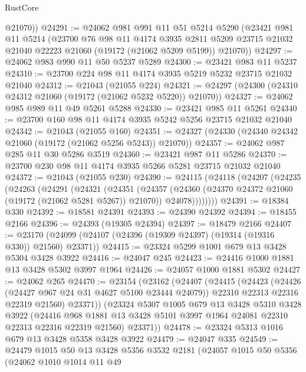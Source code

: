 \begin{lexlean}{RustCore}
\begin{coremodule}
        @21070))
@24291 := @24062
    @981
    @991
    @11
    @51
    @5214
    @5290
    (@23421
      @981
      @11
      @5214
      (@23700
        @76
        @98
        @11
        @4174
        @3935
        @2811
        @5209
        @23715
        @21032
        @21040
        @22223
        @21060
        (@19172 (@21062 @5209 @5199))
        @21070))
@24297 := @24062 @983 @990 @11 @50 @5237 @5289
@24300 := @23421 @983 @11 @5237
@24310 := @23700 @224 @98 @11 @4174 @3935 @5219 @5232 @23715 @21032 @21040
@24312 := @21043 (@21055 @224)
@24321 := @24297 (@24300 (@24310 @24312 @21060 (@19172 (@21062 @5232 @5220)) @21070))
@24327 := @24062 @985 @989 @11 @49 @5261 @5288
@24330 := @23421 @985 @11 @5261
@24340 := @23700 @160 @98 @11 @4174 @3935 @5242 @5256 @23715 @21032 @21040
@24342 := @21043 (@21055 @160)
@24351 := @24327 (@24330 (@24340 @24342 @21060 (@19172 (@21062 @5256 @5243)) @21070))
@24357 := @24062 @987 @285 @11 @30 @5286 @3519
@24360 := @23421 @987 @11 @5286
@24370 := @23700 @230 @98 @11 @4174 @3935 @5266 @5281 @23715 @21032 @21040
@24372 := @21043 (@21055 @230)
@24390 := @24115
    (@24118
      (@24207
        (@24235
          (@24263
            (@24291
              (@24321
                (@24351
                  (@24357
                    (@24360 (@24370 @24372 @21060 (@19172 (@21062 @5281 @5267)) @21070))
                    @24078))))))))
@24391 := @18384 @330
@24392 := @18581 @24391
@24393 := @24390 @24392
@24394 := @18455 @2166
@24396 := @24393 (@19305 @24394)
@24397 := @18479 @2166
@24407 := @23170 (@24099 (@24107 (@24396 (@19309 @24397) (@19314 (@19316 @330)) @21560) @23371))
@24415 := @23324 @5299 @1001 @679 @13 @3428 @5304 @3428 @3922
@24416 := @24047 @245
@24423 := @24416 @1000 @1881 @13 @3428 @5302 @3997 @1964
@24426 := @24057 @1000 @1881 @5302
@24427 := @24062 @265
@24470 := @23154
    (@23162
      (@24407
        (@24415
          (@24423
            (@24426 (@24427 @967 @24 @31 @4627 @5100 @23444 @24079))
            @22310
            @22313
            @22316
            @22319
            @21560)
          @23371))
      (@23324
        @5307
        @1005
        @679
        @13
        @3428
        @5310
        @3428
        @3922
        (@24416 @968 @1881 @13 @3428 @5101 @3997 @1964 @24081 @22310 @22313 @22316 @22319 @21560)
        @23371))
@24478 := @23324 @5313 @1016 @679 @13 @3428 @5358 @3428 @3922
@24479 := @24047 @335
@24549 := @24479
    @1015
    @50
    @13
    @3428
    @5356
    @3532
    @2181
    (@24057
      @1015
      @50
      @5356
      (@24062
        @1010
        @1014
        @11
        @49

\end{coremodule}
\end{lexlean}
